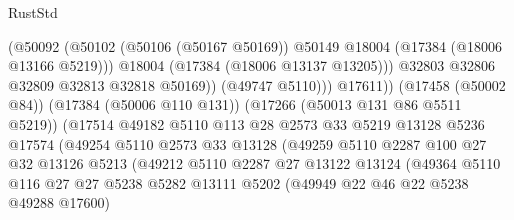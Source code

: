 \begin{lexlean}{RustStd}
\begin{coremodule}
                                        (@50092
                                          (@50102
                                            (@50106 (@50167 @50169))
                                            @50149
                                            @18004
                                            (@17384 (@18006 @13166 @5219)))
                                          @18004
                                          (@17384 (@18006 @13137 @13205)))
                                        @32803
                                        @32806
                                        @32809
                                        @32813
                                        @32818
                                        @50169))
                                    (@49747 @5110)))
                                @17611))
                            (@17458 (@50002 @84))
                            (@17384 (@50006 @110 @131))
                            (@17266 (@50013 @131 @86 @5511 @5219))
                            (@17514
                              @49182
                              @5110
                              @113
                              @28
                              @2573
                              @33
                              @5219
                              @13128
                              @5236
                              @17574
                              (@49254
                                @5110
                                @2573
                                @33
                                @13128
                                (@49259
                                  @5110
                                  @2287
                                  @100
                                  @27
                                  @32
                                  @13126
                                  @5213
                                  (@49212
                                    @5110
                                    @2287
                                    @27
                                    @13122
                                    @13124
                                    (@49364
                                      @5110
                                      @116
                                      @27
                                      @27
                                      @5238
                                      @5282
                                      @13111
                                      @5202
                                      (@49949 @22 @46 @22 @5238 @49288 @17600)

\end{coremodule}
\end{lexlean}
